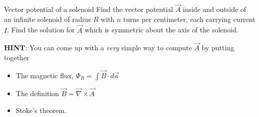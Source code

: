 \documentclass[makesolutionspdf]{esg8022pset}
\begin{document}
\begin{problem}{Vector potential of a solenoid }
Find the vector
potential $\vec A$ inside and outside of an infinite solenoid of
radius $R$ with $n$ turns per centimeter, each carrying current $I$.
Find the solution for $\vec A$ which is symmetric about the axis of
the solenoid.

{\bf HINT}: You can come up with a {\it very} simple way to compute
$\vec A$ by putting together

\begin{itemize}

\item The magnetic flux, $\Phi_B = \int \vec B\cdot d\vec a$

\item The definition $\vec B = \vec\nabla\times\vec A$

\item Stoke's theorem.
\end{itemize}

\end{problem}
\end{document}
